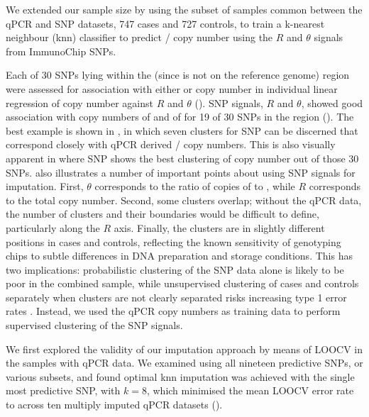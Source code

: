 We extended our sample size by using the subset of samples common between the qPCR and SNP datasets, 747 cases and 727 controls, to train a k-nearest neighbour (knn) classifier to predict / copy number using the $R$ and $\theta$ signals from ImmunoChip SNPs.

Each of 30 SNPs lying within the  (since  is not on the reference genome) region were assessed for association with either  or  copy number in individual linear regression of copy number against $R$ and $\theta$ ().
SNP signals, $R$ and $\theta$, showed good association with copy numbers of  and of  for 19 of 30 SNPs in the  region ().
The best example is shown in , in which seven clusters for SNP  can be discerned that correspond closely with qPCR derived
/ copy numbers.
This is also visually apparent in  where SNP  shows the best clustering of copy number out of those 30 SNPs.
 also illustrates a number of important points about using SNP signals for imputation.
First, $\theta$ corresponds to the ratio of copies of  to , while $R$ corresponds to the total copy number.
Second, some clusters overlap; without the qPCR data, the number of clusters and their boundaries would be difficult to define, particularly along the $R$ axis.
Finally, the clusters are in slightly different positions in cases and controls, reflecting the known sensitivity of genotyping chips to subtle differences in DNA preparation and storage conditions.
This has two implications: probabilistic clustering of the SNP data alone is likely to be poor in the combined sample, while unsupervised clustering of cases and controls separately when clusters are not clearly separated risks increasing type 1 error rates \citep{Plagnol:2007dw}.
Instead, we used the qPCR copy numbers as training data to perform supervised clustering of the SNP signals.

We first explored the validity of our imputation approach by means of \gls{LOOCV} in the samples with qPCR data.
We examined using all nineteen predictive SNPs, or various subsets, and found optimal knn imputation was achieved with the single most predictive SNP,
 with $k=8$, which minimised the mean \gls{LOOCV} error rate to  across ten multiply imputed qPCR datasets ().  

